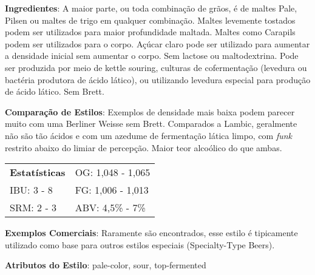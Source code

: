 \textbf{Ingredientes}: A maior parte, ou toda combinação de grãos, é de maltes Pale, Pilsen ou maltes de trigo em qualquer combinação. Maltes levemente tostados podem ser utilizados para maior profundidade maltada. Maltes como Carapils podem ser utilizados para o corpo. Açúcar claro pode ser utilizado para aumentar a densidade inicial sem aumentar o corpo. Sem lactose ou maltodextrina. Pode ser produzida por meio de kettle souring, culturas de cofermentação (levedura ou bactéria produtora de ácido lático), ou utilizando levedura especial para produção de ácido lático. Sem Brett.

\textbf{Comparação de Estilos}: Exemplos de densidade mais baixa podem parecer muito com uma Berliner Weisse sem Brett. Comparados a Lambic, geralmente não são tão ácidos e com um azedume de fermentação lática limpo, com \textit{funk} restrito abaixo do limiar de percepção. Maior teor alcoólico do que ambas.

\begin{tabular}{@{}p{35mm}p{35mm}@{}}
  \textbf{Estatísticas} & OG: 1,048 - 1,065 \\
  IBU: 3 - 8  & FG: 1,006 - 1,013 \\
  SRM: 2 - 3  & ABV: 4,5\% - 7\%
\end{tabular}

\textbf{Exemplos Comerciais}: Raramente são encontrados, esse estilo é tipicamente utilizado como base para outros estilos especiais (Specialty-Type Beers).

\textbf{Atributos do Estilo}: pale-color, sour, top-fermented
